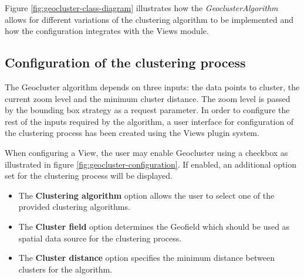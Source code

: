 Figure \ref{fig:geocluster-class-diagram} illustrates how the \textit{GeoclusterAlgorithm} allows for different variations of the clustering algorithm to be implemented and how the configuration integrates with the Views module. 

\subsection{Configuration of the clustering process}

The Geocluster algorithm depends on three inputs: the data points to cluster, the current zoom level and the minimum cluster distance. The zoom level is passed by the bounding box strategy as a request parameter. In order to configure the rest of the inputs required by the algorithm, a user interface for configuration of the clustering process has been created using the Views plugin system.

When configuring a View, the user may enable Geocluster using a checkbox as illustrated in figure \ref{fig:geocluster-configuration}. If enabled, an additional option set for the clustering process will be displayed.

\begin{itemize}

\item The \textbf{Clustering algorithm} option allows the user to select one of the provided clustering algorithms.

\item The \textbf{Cluster field} option determines the Geofield which should be used as spatial data source for the clustering process. 

\item The \textbf{Cluster distance} option specifies the minimum distance between clusters for the algorithm.

\end{itemize}

